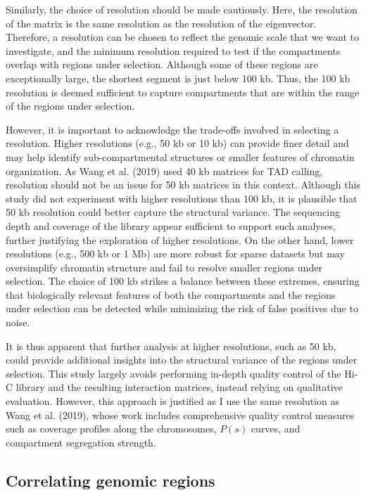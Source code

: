 \documentclass[
  11pt,
  a4paper,
]{scrbook}
\begin{document}
Similarly, the choice of resolution should be made cautiously. Here, the
resolution of the matrix is the same resolution as the resolution of the
eigenvector. Therefore, a resolution can be chosen to reflect the
genomic scale that we want to investigate, and the minimum resolution
required to test if the compartments overlap with regions under
selection. Although some of these regions are exceptionally large, the
shortest segment is just below 100 kb. Thus, the 100 kb resolution is
deemed sufficient to capture compartments that are within the range of
the regions under selection.

However, it is important to acknowledge the trade-offs involved in
selecting a resolution. Higher resolutions (e.g., 50 kb or 10 kb) can
provide finer detail and may help identify sub-compartmental structures
or smaller features of chromatin organization. As Wang et al. (2019)
used 40 kb matrices for TAD calling, resolution should not be an issue
for 50 kb matrices in this context. Although this study did not
experiment with higher resolutions than 100 kb, it is plausible that 50
kb resolution could better capture the structural variance. The
sequencing depth and coverage of the library appear sufficient to
support such analyses, further justifying the exploration of higher
resolutions. On the other hand, lower resolutions (e.g., 500 kb or 1 Mb)
are more robust for sparse datasets but may oversimplify chromatin
structure and fail to resolve smaller regions under selection. The
choice of 100 kb strikes a balance between these extremes, ensuring that
biologically relevant features of both the compartments and the regions
under selection can be detected while minimizing the risk of false
positives due to noise.

It is thus apparent that further analysis at higher resolutions, such as
50 kb, could provide additional insights into the structural variance of
the regions under selection. This study largely avoids performing
in-depth quality control of the Hi-C library and the resulting
interaction matrices, instead relying on qualitative evaluation.
However, this approach is justified as I use the same resolution as Wang
et al. (2019), whose work includes comprehensive quality control
measures such as coverage profiles along the chromosomes, \(P(s)\)
curves, and compartment segregation strength.

\subsection{Correlating genomic
regions}\label{correlating-genomic-regions}
\end{document}
